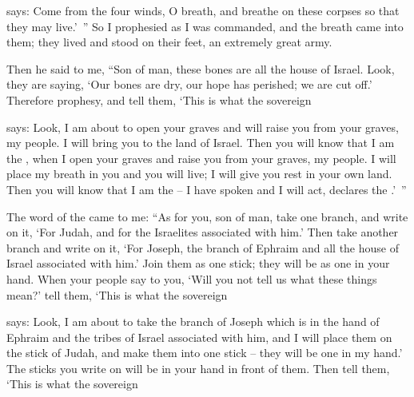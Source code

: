 {{}
says: Come
from the four
winds,
O breath,
and breathe
on these
corpses so that they may live.’ ”
So I prophesied
as
I was commanded,
and the breath
came into
them; they lived
and stood
on
their feet,
an extremely
great
army.
\par }{\PP {}Then he said
to
me, “Son
of man,
these
bones
are all
the house
of Israel.
Look,
they
are saying,
‘Our bones
are dry,
our hope
has perished;
we are cut off.’
Therefore
prophesy,
and tell
them,
‘This is what
the sovereign

{}
says: Look,
I am
about to open
your graves
and will raise you from
your graves,
my people.
I will bring
you to
the land
of Israel.
Then you will know
that
I am
the {}, when I open
your graves
and raise you from
your graves,
my people.
I will place
my breath
in you and you will live;
I will give you rest
in your own land.
Then you will know
that
I am
the {} –
I have spoken
and I will act,
declares
the {}.’ ”
\par }{\PP {}The word
of the {}
came to me:
“As for you,
son
of man,
take
one
branch,
and write
on
it, ‘For Judah,
and for the Israelites
associated
with him.’ Then take
another
branch
and write
on
it, ‘For Joseph,
the branch
of Ephraim
and all
the house
of Israel
associated with him.’
Join
them as one
stick;
they will be
as one
in your hand.
When your people
say
to you, ‘Will you not
tell
us what
these things mean?’
tell
them,
‘This is what
the sovereign

{}
says: Look,
I am
about to take
the
branch
of Joseph
which
is in the hand
of Ephraim
and the tribes
of Israel
associated
with him, and I will place
them
on
the stick
of Judah,
and make
them into one
stick
– they will be
one
in my hand.’
The sticks
you write
on
will be
in your hand
in front of them.
Then tell
them,
‘This is what
the sovereign

}
